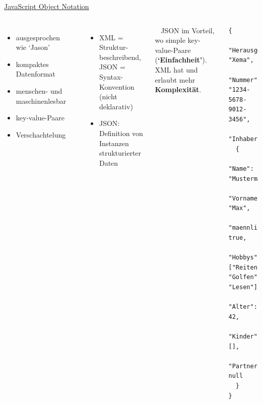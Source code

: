 \begin{frame}[fragile]{\href{https://de.wikipedia.org/wiki/JavaScript_Object_Notation}{JavaScript Object Notation}}
\begin{columns}
\begin{itemize}\footnotesize
    \item ausgesprochen wie `Jason' \item kompaktes Datenformat \item menschen- und maschinenlesbar \item key-value-Paare \item Verschachtelung
\end{itemize}

\\
\begin{itemize}\footnotesize
    \item XML = Struktur-beschreibend, JSON = Syntax-Konvention (nicht deklarativ) \item JSON: Definition von Instanzen strukturierter Daten
\end{itemize}

~ JSON im Vorteil, wo simple key-value-Paare (\textbf{`Einfachheit'}). XML hat und erlaubt mehr \textbf{Komplexität}.
~\\
~


\footnotesize
\begin{verbatim}
{
  "Herausgeber": "Xema",
  "Nummer": "1234-5678-9012-3456",
  "Inhaber":
  {
    "Name": "Mustermann",
    "Vorname": "Max",
    "maennlich": true,
    "Hobbys": ["Reiten", "Golfen", "Lesen"],
    "Alter": 42,
    "Kinder": [],
    "Partner": null
  }
}
\end{verbatim}\normalsize
\end{columns}


\end{frame}


